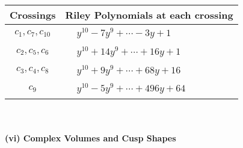 \documentclass[1p]{elsarticle_modified}
\theoremstyle{definition}
\begin{document}
\begin{tabular}{m{50pt}|m{274pt}}
Crossings & \hspace{64pt}Riley Polynomials at each crossing \\
\hline $$\begin{aligned}c_{1},c_{7},c_{10}\end{aligned}$$&$\begin{aligned}
&y^{10}-7 y^9+\cdots-3 y+1
\end{aligned}$\\
\hline $$\begin{aligned}c_{2},c_{5},c_{6}\end{aligned}$$&$\begin{aligned}
&y^{10}+14 y^9+\cdots+16 y+1
\end{aligned}$\\
\hline $$\begin{aligned}c_{3},c_{4},c_{8}\end{aligned}$$&$\begin{aligned}
&y^{10}+9 y^9+\cdots+68 y+16
\end{aligned}$\\
\hline $$\begin{aligned}c_{9}\end{aligned}$$&$\begin{aligned}
&y^{10}-5 y^9+\cdots+496 y+64
\end{aligned}$\\
\hline
\end{tabular}\\~\\
\newpage\flushleft \textbf{(vi) Complex Volumes and Cusp Shapes}
\end{document}
